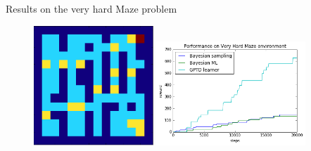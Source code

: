 \documentclass{beamer}
\begin{document}
\begin{frame}{Results on the very hard Maze problem}
\begin{figure}[!htb]
\centering
\includegraphics[width=0.4\textwidth]{veryhardmaze}
\includegraphics[width=0.5\textwidth]{veryHardMazePerf}
\end{figure}
\end{frame}
\end{document}
